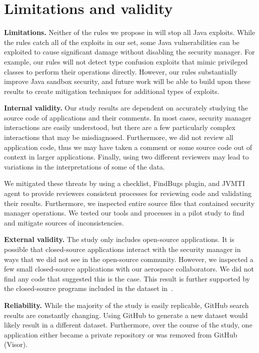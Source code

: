\documentclass{sig-alternate}
\newcommand{\minisec}[1]{\vspace{2ex}\noindent\textbf{#1}}
\begin{document}
\section{Limitations and validity}\label{sec:Limitations}

\minisec{Limitations.}
Neither of the rules we propose in  will stop all Java exploits. While the rules
catch all of the exploits in our set, some Java vulnerabilities can
be exploited to cause significant damage without disabling the security
manager. For example, our rules will not detect type confusion exploits
that mimic privileged classes to perform their operations directly.
However, our rules substantially improve Java sandbox security, and
future work will be able to build upon these results to create mitigation
techniques for additional types of exploits.

\minisec{Internal validity.} 
Our study results are dependent on accurately studying the source code of
applications and their comments. In most cases, security manager interactions
are easily understood, but there are a few particularly complex interactions
that may be misdiagnosed. Furthermore, we did not review all application
code, thus we may have taken a comment or some source code out of
context in larger applications. Finally, using two different reviewers
may lead to variations in the interpretations of some of the data. 

We mitigated these threats by using a checklist, FindBugs plugin, and JVMTI agent to
provide reviewers consistent processes for reviewing code
and validating their results. Furthermore,
we inspected entire source files that contained
security manager operations. We tested our tools and processes in a pilot study
to find and mitigate sources of inconsistencies.

\minisec{External validity.}
The study only includes open-source applications. It is possible
that closed-source applications interact with the security manager
in ways that we did not see in the open-source community. However,
we inspected a few small closed-source applications with our aerospace collaborators.
We did not find any code that suggested this is the case.  This result is
further supported by the closed-source programs included in the dataset
in~. 

\minisec{Reliability.}
While the majority of the study is easily replicable, GitHub search results are constantly
changing. Using GitHub to generate a new dataset
would likely result in a different dataset. Furthermore, over the course of the
study, one application either became a private repository
or was removed from GitHub (Visor).
\end{document}
